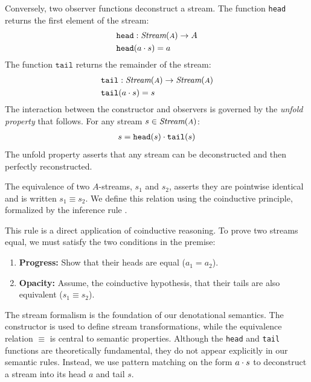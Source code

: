 Conversely, two observer functions deconstruct a stream. The function \texttt{head} returns the
first element of the stream:
\begin{align}
     & \texttt{head} : \textit{Stream}(\mbox{\footnotesize\ensuremath{A}}) \to A \\
     & \texttt{head}(a \cdot s) = a
\end{align}
%
The function $\texttt{tail}$ returns the remainder of the stream:
\begin{align}
     & \texttt{tail} : \textit{Stream}(\mbox{\footnotesize\ensuremath{A}}) \to \textit{Stream}(\mbox{\footnotesize\ensuremath{A}}) \\
     & \texttt{tail}(a \cdot s) = s
\end{align}
%
The interaction between the constructor and observers is governed by the \emph{unfold property} that
follows. For any stream $s \in \textit{Stream}(\mbox{\footnotesize\ensuremath{A}})$:
%
\begin{align}
    s = \texttt{head}(s) \cdot \texttt{tail}(s) \label{eq:semantics:streams:unfold}
\end{align}
%
The unfold property asserts that any stream can be deconstructed and then perfectly reconstructed.

The equivalence of two $A$-streams, $s_1$ and $s_2$, asserts they are pointwise identical and is
written $s_1 \equiv s_2$. We define this relation using the coinductive principle, formalized by the
inference rule .
%
%
This rule is a direct application of coinductive reasoning. To prove two streams equal, we must
satisfy the two conditions in the premise:
%
\begin{enumerate}
    \item \textbf{Progress:} Show that their heads are equal ($a_1 = a_2$).
    \item \textbf{Opacity:} Assume, \via the coinductive hypothesis, that their tails are also
          equivalent ($s_1 \equiv s_2$).
\end{enumerate}

The stream formalism is the foundation of our denotational semantics. The constructor \step is used
to define stream transformations, while the equivalence relation $\equiv$ is central to semantic
properties. Although the \texttt{head} and \texttt{tail} functions are theoretically fundamental,
they do not appear explicitly in our semantic rules. Instead, we use pattern matching on the form
$a \cdot s$ to deconstruct a stream into its head $a$ and tail $s$.

